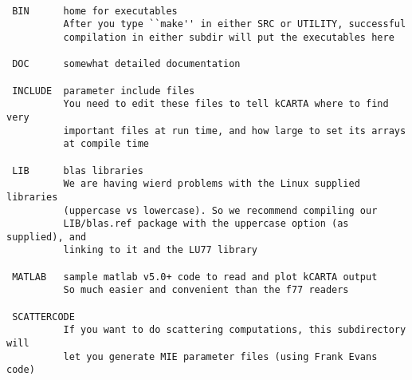 \documentclass[11pt]{article}
\begin{document}
\begin{verbatim}

 BIN      home for executables
          After you type ``make'' in either SRC or UTILITY, successful 
          compilation in either subdir will put the executables here

 DOC      somewhat detailed documentation

 INCLUDE  parameter include files
          You need to edit these files to tell kCARTA where to find very
          important files at run time, and how large to set its arrays
          at compile time

 LIB      blas libraries
          We are having wierd problems with the Linux supplied libraries
          (uppercase vs lowercase). So we recommend compiling our 
          LIB/blas.ref package with the uppercase option (as supplied), and
          linking to it and the LU77 library

 MATLAB   sample matlab v5.0+ code to read and plot kCARTA output
          So much easier and convenient than the f77 readers

 SCATTERCODE
          If you want to do scattering computations, this subdirectory will
          let you generate MIE parameter files (using Frank Evans code)


\end{verbatim}
\end{document}
